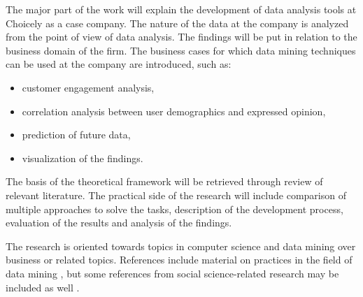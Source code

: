 \documentclass[english]{tktltiki}
\begin{document}
	The major part of the work will explain the development of data analysis tools at Choicely as a case company. The nature of the data at the company is analyzed from the point of view of data analysis. The findings will be put in relation to the business domain of the firm. The business cases for which data mining techniques can be used at the company are introduced, such as:  
	
	\begin{itemize}
		\item customer engagement analysis,
		\item correlation analysis between user demographics and expressed opinion, 
		\item prediction of future data,
		\item visualization of the findings.
	\end{itemize}
	
    The basis of the theoretical framework will be retrieved through review of relevant literature. The practical side of the research will include comparison of multiple approaches to solve the tasks, description of the development process, evaluation of the results and analysis of the findings. 
    
    The research is oriented towards topics in computer science and data mining over business or related topics. References include material on practices in the field of data mining \cite{witten2016data, introtodatamining, inmon2007tapping, zarsky2002mine, bose2001business, data_mining_and_knowledge_discovery, monetisingusergeneratedcontent, datamininginbusinessprocesses}, but some references from social science-related research may be included as well \cite{kahneman1982psychology, pang2008opinion}.
  
\nocite{*}



\lastpage

\appendices

\pagestyle{empty}

%
%
\end{document}
